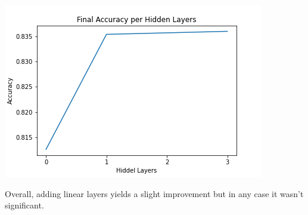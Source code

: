 \includegraphics{q5/acc_per_hl.png}

Overall, adding linear layers yields a slight improvement but in any case it wasn't significant.